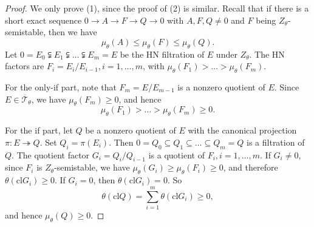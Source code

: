 \documentclass[a4paper,12pt]{amsart}
\numberwithin{equation}{section}
\newcommand{\cl}{\mathrm{cl}}
\newcommand{\1}{\mathbf{1}}
\begin{document}
\begin{proof}
    We only prove (1), since the proof of (2) is similar. Recall that if there is a short exact sequence $0\rightarrow A\rightarrow F\rightarrow Q\rightarrow0$ with $A,F,Q\neq0$ and $F$ being $Z_\theta$-semistable, then we have
    \[\mu_\theta(A)\leqslant\mu_\theta(F)\leqslant\mu_\theta(Q).\]
    Let $0=E_0\subsetneqq E_1\subsetneqq\dots\subsetneqq E_m=E$ be the HN filtration of $E$ under $Z_\theta$. The HN factors are $F_i=E_i/E_{i-1},i=1,\dots,m$, with $\mu_\theta(F_1)>\dots>\mu_\theta(F_m)$.

    For the only-if part, note that $F_m=E/E_{m-1}$ is a nonzero quotient of $E$. Since $E\in\overline{\mathcal{T}}_\theta$, we have $\mu_\theta(F_m)\geqslant0$, and hence
    \[\mu_\theta(F_1)>\dots>\mu_\theta(F_m)\geqslant0.\]

    For the if part, let $Q$ be a nonzero quotient of $E$ with the canonical projection $\pi:E\twoheadrightarrow Q$. Set $Q_i=\pi(E_i)$. Then $0=Q_0\subseteq Q_1\subseteq\dots\subseteq Q_m=Q$ is a filtration of $Q$. The quotient factor $G_i=Q_i/Q_{i-1}$ is a quotient of $F_i,i=1,\dots,m$. If $G_i\neq0$, since $F_i$ is $Z_\theta$-semistable, we have $\mu_\theta(G_i)\geqslant\mu_\theta(F_i)\geqslant0$, and therefore $\theta(\cl G_i)\geqslant0$. If $G_i=0$, then $\theta(\cl G_i)=0$. So
    \[\theta(\cl Q)=\sum_{i=1}^m\theta(\cl G_i)\geqslant0,\]
    and hence $\mu_\theta(Q)\geqslant0$.
\end{proof}
\end{document}
